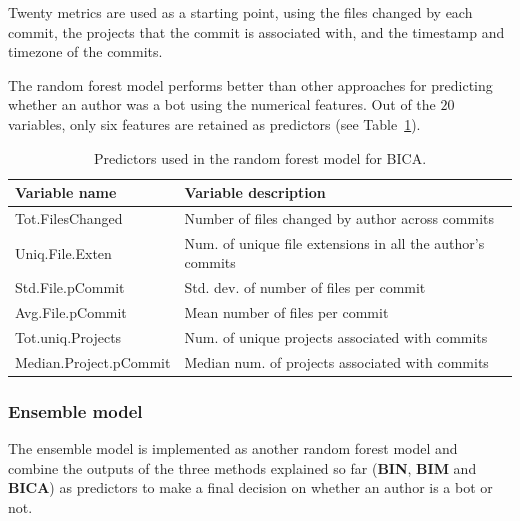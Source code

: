 \documentclass[a4paper, 12pt]{book}
\begin{document}
Twenty metrics are used as a starting point, using the files changed by each commit, the projects that the commit is associated with, and the timestamp and timezone of the commits.

The random forest model performs better than other approaches for predicting whether an author was a bot using the numerical features. Out of the $20$ variables, only six features are retained as predictors (see Table~\ref{table:dey-table-predictors}).

\begin{table}[htb]
\renewcommand{\arraystretch}{1.2}
 \begin{center}
  \begin{tabular}{   p{5cm}   %
    >{\raggedright\arraybackslash} p{10cm} }  
    \toprule
    \textbf{Variable name} & \textbf{Variable description}\\ 
    \midrule
    Tot.FilesChanged & Number of files changed by author across commits  \\ %
    Uniq.File.Exten & Num. of unique file extensions in all the author's commits \\ %
    Std.File.pCommit & Std. dev. of number of files per commit \\ %
    Avg.File.pCommit & Mean number of files per commit \\ %
    Tot.uniq.Projects & Num. of unique projects associated with commits\\ %
    Median.Project.pCommit & Median num. of projects associated with commits\\
    \bottomrule
  \end{tabular}
  \caption{Predictors used in the random forest model for BICA.}
  \label{table:dey-table-predictors}
 \end{center}
\end{table}


\subsubsection{Ensemble model}
\label{sssec:dey-ensemble}

The ensemble model is implemented as another random forest model and combine the outputs of the three methods explained so far (\textbf{BIN}, \textbf{BIM} and \textbf{BICA}) as predictors to make a final decision on whether an author is a bot or not.
\end{document}
